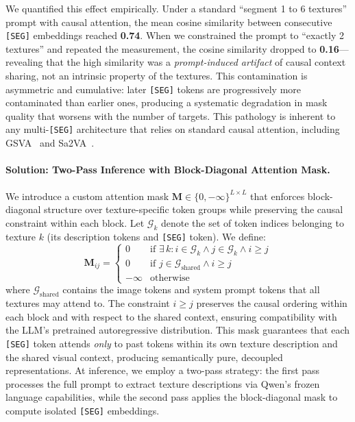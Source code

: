 \documentclass{article}
\begin{document}
We quantified this effect empirically. Under a standard ``segment 1 to 6 textures'' prompt with causal attention, the mean cosine similarity between consecutive \texttt{[SEG]} embeddings reached \textbf{0.74}. When we constrained the prompt to ``exactly 2 textures'' and repeated the measurement, the cosine similarity dropped to \textbf{0.16}---revealing that the high similarity was a \emph{prompt-induced artifact} of causal context sharing, not an intrinsic property of the textures. This contamination is asymmetric and cumulative: later \texttt{[SEG]} tokens are progressively more contaminated than earlier ones, producing a systematic degradation in mask quality that worsens with the number of targets. This pathology is inherent to any multi-\texttt{[SEG]} architecture that relies on standard causal attention, including GSVA~\cite{gsva} and Sa2VA~\cite{sa2va}.

\paragraph{Solution: Two-Pass Inference with Block-Diagonal Attention Mask.}
We introduce a custom attention mask $\mathbf{M} \in \{0, -\infty\}^{L \times L}$ that enforces block-diagonal structure over texture-specific token groups while preserving the causal constraint within each block. Let $\mathcal{G}_k$ denote the set of token indices belonging to texture $k$ (its description tokens and \texttt{[SEG]} token). We define:
\begin{equation}
    \mathbf{M}_{ij} = \begin{cases}
        0 & \text{if } \exists\, k: i \in \mathcal{G}_k \wedge j \in \mathcal{G}_k \wedge i \geq j \\
        0 & \text{if } j \in \mathcal{G}_{\text{shared}} \wedge i \geq j \\
        -\infty & \text{otherwise}
    \end{cases}
\end{equation}
where $\mathcal{G}_{\text{shared}}$ contains the image tokens and system prompt tokens that all textures may attend to. The constraint $i \geq j$ preserves the causal ordering within each block and with respect to the shared context, ensuring compatibility with the LLM's pretrained autoregressive distribution. This mask guarantees that each \texttt{[SEG]} token attends \emph{only} to past tokens within its own texture description and the shared visual context, producing semantically pure, decoupled representations. At inference, we employ a two-pass strategy: the first pass processes the full prompt to extract texture descriptions via Qwen's frozen language capabilities, while the second pass applies the block-diagonal mask to compute isolated \texttt{[SEG]} embeddings.
\end{document}
